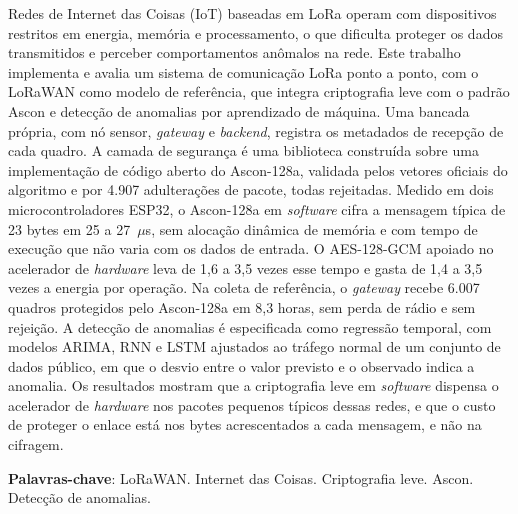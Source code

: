 \documentclass[
	12pt,				%
	openright,			%
	twoside,			%
	a4paper,			%
	english,			%
	brazilian				%
	]{abntex2}
\begin{document}



\setlength{\absparsep}{18pt} %
\begin{resumo}
Redes de Internet das Coisas (IoT) baseadas em LoRa operam com dispositivos restritos em energia, memória e processamento, o que dificulta proteger os dados transmitidos e perceber comportamentos anômalos na rede. Este trabalho implementa e avalia um sistema de comunicação LoRa ponto a ponto, com o LoRaWAN como modelo de referência, que integra criptografia leve com o padrão Ascon e detecção de anomalias por aprendizado de máquina. Uma bancada própria, com nó sensor, \textit{gateway} e \textit{backend}, registra os metadados de recepção de cada quadro. A camada de segurança é uma biblioteca construída sobre uma implementação de código aberto do Ascon-128a, validada pelos vetores oficiais do algoritmo e por 4.907 adulterações de pacote, todas rejeitadas. Medido em dois microcontroladores ESP32, o Ascon-128a em \textit{software} cifra a mensagem típica de 23 bytes em 25 a 27~$\mu$s, sem alocação dinâmica de memória e com tempo de execução que não varia com os dados de entrada. O AES-128-GCM apoiado no acelerador de \textit{hardware} leva de 1,6 a 3,5 vezes esse tempo e gasta de 1,4 a 3,5 vezes a energia por operação. Na coleta de referência, o \textit{gateway} recebe 6.007 quadros protegidos pelo Ascon-128a em 8,3 horas, sem perda de rádio e sem rejeição. A detecção de anomalias é especificada como regressão temporal, com modelos ARIMA, RNN e LSTM ajustados ao tráfego normal de um conjunto de dados público, em que o desvio entre o valor previsto e o observado indica a anomalia. Os resultados mostram que a criptografia leve em \textit{software} dispensa o acelerador de \textit{hardware} nos pacotes pequenos típicos dessas redes, e que o custo de proteger o enlace está nos bytes acrescentados a cada mensagem, e não na cifragem.

 \textbf{Palavras-chave}: LoRaWAN. Internet das Coisas. Criptografia leve. Ascon. Detecção de anomalias.
\end{resumo}
\end{document}
